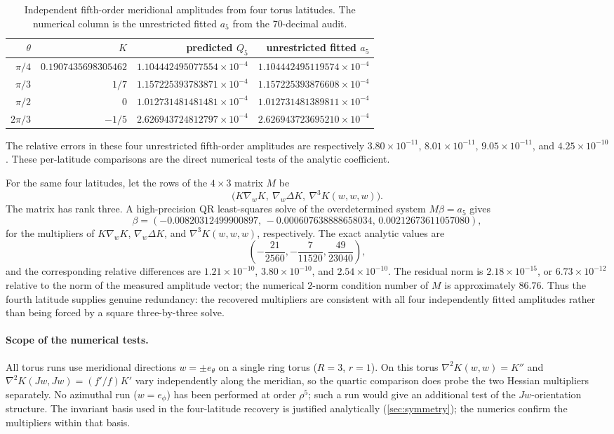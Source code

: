 \documentclass[11pt]{amsart}
\numberwithin{equation}{section}
\theoremstyle{remark}
\newcommand{\Hess}{\nabla^2}
\begin{document}
\begin{table}[htbp]
\centering
\caption{Independent fifth-order meridional amplitudes from four torus latitudes.  The numerical column is the unrestricted fitted $a_5$ from the 70-decimal audit.}
\label{tab:four-latitude-q5}
\begin{tabular}{rrrr}
\toprule
$\theta$ & $K$ & predicted $Q_5$ & unrestricted fitted $a_5$\\
\midrule
$\pi/4$ & $0.1907435698305462$ & $1.104442495077554\times10^{-4}$ & $1.104442495119574\times10^{-4}$\\
$\pi/3$ & $1/7$ & $1.157225393783871\times10^{-4}$ & $1.157225393876608\times10^{-4}$\\
$\pi/2$ & $0$ & $1.012731481481481\times10^{-4}$ & $1.012731481389811\times10^{-4}$\\
$2\pi/3$ & $-1/5$ & $2.626943724812797\times10^{-4}$ & $2.626943723695210\times10^{-4}$\\
\bottomrule
\end{tabular}
\end{table}
The relative errors in these four unrestricted fifth-order amplitudes are respectively $3.80\times10^{-11}$, $8.01\times10^{-11}$, $9.05\times10^{-11}$, and $4.25\times10^{-10}$.  These per-latitude comparisons are the direct numerical tests of the analytic coefficient.

For the same four latitudes, let the rows of the $4\times3$ matrix $M$ be
\[
\bigl(K\nabla_wK,\ \nabla_w\Delta K,\ \nabla^3K(w,w,w)\bigr).
\]
The matrix has rank three.  A high-precision QR least-squares solve of the overdetermined system $M\beta=a_5$ gives
\[
\beta=(-0.00820312499900897,\,-0.000607638888658034,\,0.00212673611057080),
\]
for the multipliers of $K\nabla_wK$, $\nabla_w\Delta K$, and $\nabla^3K(w,w,w)$, respectively.  The exact analytic values are
\[
\left(-\frac{21}{2560},-\frac7{11520},\frac{49}{23040}\right),
\]
and the corresponding relative differences are $1.21\times10^{-10}$, $3.80\times10^{-10}$, and $2.54\times10^{-10}$.  The residual norm is $2.18\times10^{-15}$, or $6.73\times10^{-12}$ relative to the norm of the measured amplitude vector; the numerical $2$-norm condition number of $M$ is approximately $86.76$.  Thus the fourth latitude supplies genuine redundancy: the recovered multipliers are consistent with all four independently fitted amplitudes rather than being forced by a square three-by-three solve.

\paragraph{Scope of the numerical tests.}
All torus runs use meridional directions $w=\pm e_\theta$ on a single ring torus ($R=3$, $r=1$). On this torus $\Hess K(w,w)=K''$ and $\Hess K(Jw,Jw)=(f'/f)K'$ vary independently along the meridian, so the quartic comparison does probe the two Hessian multipliers separately. No azimuthal run ($w=e_\phi$) has been performed at order $\rho^5$; such a run would give an additional test of the $Jw$-orientation structure. The invariant basis used in the four-latitude recovery is justified analytically (\cref{sec:symmetry}); the numerics confirm the multipliers within that basis.
\end{document}
